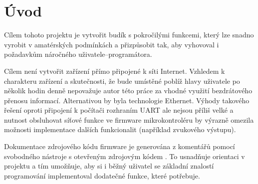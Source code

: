 \section*{Úvod}  %
Cílem tohoto projektu je vytvořit budík s pokročilými funkcemi, který lze
snadno vyrobit v amatérských podmínkách a přizpůsobit tak, aby vyhovoval
i požadavkům náročného uživatele--programátora. %

Cílem není vytvořit zařízení přímo připojené k síti Internet. Vzhledem
k charakteru zařízení a skutečnosti, že bude umístěné poblíž hlavy uživatele
po několik hodin denně nepovažuje autor této práce za vhodné využití
bezdrátového přenosu informací. Alternativou by byla technologie Ethernet.
Výhody takového řešení oproti připojení k počítači rozhraním UART ale nejsou
příliš velké a nutnost obsluhovat síťové funkce ve firmware mikrokontroléru by
výrazně omezila možnosti implementace dalších funkcionalit (například zvukového
výstupu).

Dokumentace zdrojového kódu firmware je generována z komentářů pomocí
svobodného nástroje s otevřeným zdrojovým kódem . To
usnadňuje orientaci v projektu a tím umožňuje, aby si i běžný uživatel se
základní znalostí programování implementoval dodatečné funkce, které potřebuje.


